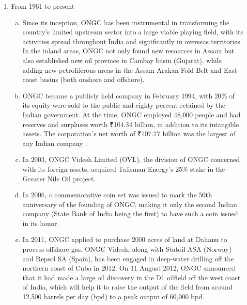 \begin{enumerate}
\begin{enumerate}[(a)]
\end{enumerate}


\item From 1961 to present

\begin{enumerate}[(a)]

\item Since its inception, ONGC has been instrumental in transforming the country's limited upstream sector into a large viable playing field, with its activities spread throughout India and significantly in overseas territories. In the inland areas, ONGC not only found new resources in Assam but also established new oil province in Cambay basin (Gujarat), while adding new petroliferous areas in the Assam-Arakan Fold Belt and East coast basins (both onshore and offshore).

\item ONGC became a publicly held company in February 1994, with 20\% of its equity were sold to the public and eighty percent retained by the Indian government. At the time, ONGC employed 48,000 people and had reserves and surpluses worth ₹104.34 billion, in addition to its intangible assets. The corporation's net worth of ₹107.77 billion was the largest of any Indian company .

\item In 2003, ONGC Videsh Limited (OVL), the division of ONGC concerned with its foreign assets, acquired Talisman Energy's 25\% stake in the Greater Nile Oil project.

\item In 2006, a commemorative coin set was issued to mark the 50th anniversary of the founding of ONGC, making it only the second Indian company (State Bank of India being the first) to have such a coin issued in its honor.

\item In 2011, ONGC applied to purchase 2000 acres of land at Dahanu to process offshore gas. ONGC Videsh, along with Statoil ASA (Norway) and Repsol SA (Spain), has been engaged in deep-water drilling off the northern coast of Cuba in 2012. On 11 August 2012, ONGC announced that it had made a large oil discovery in the D1 oilfield off the west coast of India, which will help it to raise the output of the field from around 12,500 barrels per day (bpd) to a peak output of 60,000 bpd.


\begin{table}[H]

\centering


\end{table}
\end{enumerate}
\end{enumerate}
